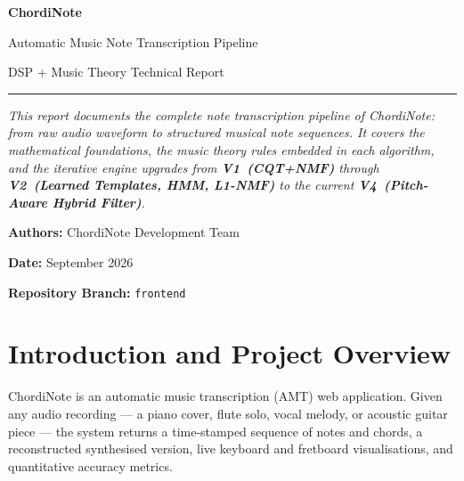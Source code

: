 \documentclass[12pt, a4paper]{article}
\begin{document}
\begin{titlepage}
  \centering
  \vspace*{2.5cm}
  {\Huge\bfseries\color{primaryblue} ChordiNote\par}
  \vspace{0.4cm}
  {\Large\color{accentpurple} Automatic Music Note Transcription Pipeline\par}
  \vspace{0.2cm}
  {\large\color{gray} DSP + Music Theory Technical Report\par}
  \vspace{1.5cm}
  \rule{0.6\textwidth}{1pt}
  \vspace{1.5cm}
  \begin{tcolorbox}[colback=noteboxbg,colframe=noteboxborder,arc=6pt,boxrule=1pt,width=0.85\textwidth]
    \centering
    \textit{This report documents the complete note transcription pipeline of ChordiNote:
    from raw audio waveform to structured musical note sequences. It covers the
    mathematical foundations, the music theory rules embedded in each algorithm,
    and the iterative engine upgrades from \textbf{V1~(CQT+NMF)} through
    \textbf{V2~(Learned Templates, HMM, L1-NMF)} to the current
    \textbf{V4~(Pitch-Aware Hybrid Filter)}.}
  \end{tcolorbox}
  \vspace{2cm}
  {\large\textbf{Authors:} ChordiNote Development Team\par}
  \vspace{0.3cm}
  {\large\textbf{Date:} September 2026\par}
  \vspace{0.3cm}
  {\large\textbf{Repository Branch:} \texttt{frontend}\par}
\end{titlepage}

\tableofcontents
\newpage

\section{Introduction and Project Overview}

ChordiNote is an automatic music transcription (AMT) web application.
Given any audio recording --- a piano cover, flute solo, vocal melody, or
acoustic guitar piece --- the system returns a time-stamped sequence of notes
and chords, a reconstructed synthesised version, live keyboard and fretboard
visualisations, and quantitative accuracy metrics.
\end{document}
